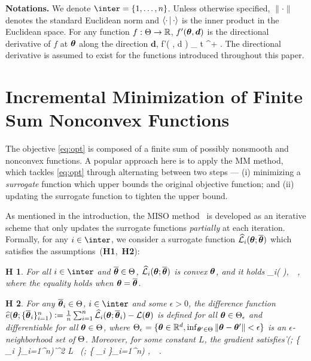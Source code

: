 \documentclass{article}
\newtheorem{assumption}{H\!\!}
\begin{document}
\textbf{Notations.}
We denote $\inter=\{1,\dots,n\}$. Unless otherwise specified,  $\| \cdot \|$ denotes the standard Euclidean norm and $\pscal{ \cdot }{\cdot }$ is the inner product in the Euclidean space.
For any function $f : \Param \rightarrow \rset$,  $f'( \param, {\bm d} )$ is the directional derivative of $f$ at $\param$ along the direction ${\bm d}$, \ie
\beq
f'( \param, {\bm d} ) \eqdef \lim_{ t ^+ }  \eqsp.
\eeq
The directional derivative is assumed to exist for the functions introduced throughout this paper.


\vspace{-0.05in}
\section{Incremental Minimization of Finite Sum Nonconvex Functions}\label{sec:framework}
\vspace{-0.05in}

The objective \eqref{eq:opt} is composed of a finite sum of possibly nonsmooth and nonconvex functions.
A popular approach here is to apply the MM method, which tackles \eqref{eq:opt} through alternating between two steps --- {\sf (i)} minimizing a  \emph{surrogate} function which upper bounds the original objective function; and {\sf (ii)} updating the surrogate function to tighten the upper bound.

As mentioned in the introduction, the MISO method~\cite{mairal2015miso} is developed as an iterative scheme that only  updates the surrogate functions \emph{partially} at each iteration.
Formally, for any $i \in \inter$, we consider a surrogate function $\sur{i}{\param}{\op}$ which satisfies the assumptions~(\textbf{H1},~\textbf{H2}):
\begin{assumption} \label{ass:sur} For all $i \in \inter$ and $\op \in \Param$, $\sur{i}{\param}{\op}$ is convex \wrt $\param$, and it holds
\beq \label{eq:lowerbd}
 _i( \param ),~\forall~\param \in \Param \eqsp,
\eeq
where the equality holds when $\param = \op$.
\end{assumption}
\begin{assumption} \label{ass:diff}
For any $\op_i \in \Param$, $i \in \inter$ and some $\epsilon > 0$, the difference function $\widehat{e}(\param ; \{ \op_i \}_{i=1}^n ) \eqdef \frac{1}{n} \sum_{i=1}^n \sur{i}{\param}{\op_i } - {\cal L}( \param)$ is defined for all $\param \in \Param_\epsilon$ and differentiable for all $\param \in \Param$, where $\Param_\epsilon = \{ \param \in \rset^d, \inf_{\param' \in \Param} \| \param - \param' \| < \epsilon \}$ is an $\epsilon$-neighborhood set of $\Param$. Moreover, for some constant $L$, the gradient satisfies
\beq
\label{eq:eq30}
\| \grd {}(\param; \{ \op_i \}_{i=1}^n)  \|^2  L\!~ (\param; \{ \op_i \}_{i=1}^n) ,~\forall~\param \in \Param \eqsp.
\eeq
\end{assumption}
\end{document}
